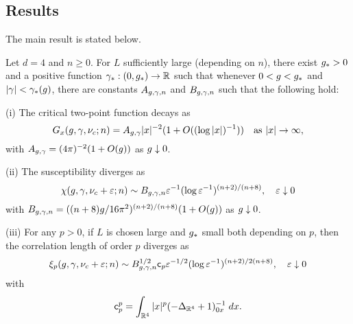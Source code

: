 
\subsection{Results}

The main result is stated below.

\begin{theorem} \label{thm:suscept}
  Let $d = 4$ and $n \ge 0$. For $L$ sufficiently large (depending on $n$),
  there exist $g_* > 0$
  and a positive function $\gamma_* : (0, g_*) \rightarrow {\mathbb R}$
  such that whenever $0 < g < g_*$ and $|\gamma| < \gamma_*(g)$,
  there are constants $A_{g,\gamma,n}$ and $B_{g,\gamma,n}$ such that the following hold:

  \smallskip\noindent
  (i)
  The critical two-point function decays as
  \begin{equation}
    G_x(g,\gamma,\nu_c; n)
        =
    A_{g,\gamma} |x|^{-2} (1 + O((\log |x|)^{-1}))
        \quad
    \text{as $|x|\rightarrow\infty$},
  \end{equation}
  with $A_{g,\gamma} = (4 \pi)^{-2} (1 + O(g))$ as $g \downarrow 0$.

  \smallskip\noindent
  (ii)
  The susceptibility diverges as
  \begin{equation} \label{e:chieps-asympt}
    \chi(g, \gamma, \nu_c + \varepsilon; n)
      \sim B_{g,\gamma,n} \varepsilon^{-1} (\log \varepsilon^{-1})^{(n+2)/(n+8)},
    \quad \varepsilon\downarrow 0
  \end{equation}
  with $B_{g,\gamma,n} = ((n + 8) g / 16\pi^2)^{(n+2)/(n+8)} (1 + O(g))$
  as $g \downarrow 0$.

  \smallskip\noindent
  (iii) For any $p >0$, if $L$ is chosen large and $g_*$ small both depending on $p$,
  then the correlation length of order $p$ diverges as
  \begin{equation} \label{e:xieps-asympt}
    \xi_p(g, \gamma, \nu_c + \varepsilon; n)
     \sim B_{g,\gamma,n}^{1/2} {\sf c}_p \varepsilon^{-1/2} (\log \varepsilon^{-1})^{(n+2)/2(n+8)},
    \quad \varepsilon\downarrow 0
  \end{equation}
  with
  \begin{equation}
  {\sf c}_p^p = \int_{{\mathbb R}^4} |x|^p (-\Delta_{{\mathbb R}^4} + 1)^{-1}_{0x} \; dx.
  \end{equation}
\end{theorem}

